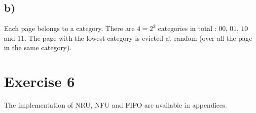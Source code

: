 \documentclass[a4paper,11pt]{report}
\begin{document}
\subsection*{b)}

Each page belongs to a category. There are $4 = 2^2$ categories in total : $00$,
$01$, $10$ and $11$. The page with the lowest category is evicted at random
(over all the page in the same category).

\section*{Exercise 6}

The implementation of NRU, NFU and FIFO are available in appendices.
\end{document}
